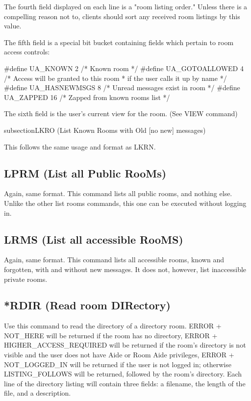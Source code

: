  The fourth field displayed on each line is a "room listing order."  Unless
there is a compelling reason not to, clients should sort any received room
listings by this value.

 The fifth field is a special bit bucket containing fields which pertain to
room access controls:

\#define UA_KNOWN                2	/* Known room */
\#define UA_GOTOALLOWED          4	/* Access will be granted to this room
					 * if the user calls it up by name */
\#define UA_HASNEWMSGS           8	/* Unread messages exist in room */
\#define UA_ZAPPED              16	/* Zapped from known rooms list */

 The sixth field is the user's current view for the room. (See VIEW command)



subsection{LKRO (List Known Rooms with Old [no new] messages)}

 This follows the same usage and format as LKRN.



\subsection{LPRM (List all Public RooMs)}

 Again, same format.  This command lists all public rooms, and nothing else.
Unlike the other list rooms commands, this one can be executed without logging
in.



\subsection{LRMS (List all accessible RooMS)}

 Again, same format.  This command lists all accessible rooms, known and
forgotten, with and without new messages.  It does not, however, list
inaccessible private rooms.



\subsection{*RDIR (Read room DIRectory)}

 Use this command to read the directory of a directory room.  ERROR + NOT_HERE
will be returned if the room has no directory, ERROR + HIGHER_ACCESS_REQUIRED
will be returned if the room's directory is not visible and the user does not
have Aide or Room Aide privileges, ERROR + NOT_LOGGED_IN will be returned if
the user is not logged in; otherwise LISTING_FOLLOWS will be returned,
followed by the room's directory.  Each line of the directory listing will
contain three fields: a filename, the length of the file, and a description.

